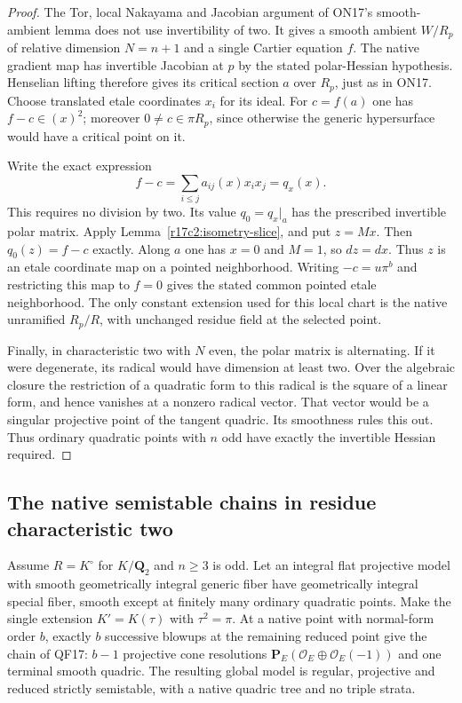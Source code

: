 \begin{proof}
The Tor, local Nakayama and Jacobian argument of ON17's
smooth-ambient lemma does not use invertibility of two.
It gives a smooth ambient $W/R_p$ of relative dimension
$N=n+1$ and a single Cartier equation $f$. The native
gradient map has invertible Jacobian at $p$ by the stated
polar-Hessian hypothesis. Henselian lifting therefore gives
its critical section $a$ over $R_p$, just as in ON17.
Choose translated etale coordinates $x_i$ for its ideal.
For $c=f(a)$ one has $f-c\in(x)^2$; moreover
$0\ne c\in\pi R_p$, since otherwise the generic
hypersurface would have a critical point on it.

Write the exact expression
\[
        f-c=\sum_{i\le j}a_{ij}(x)x_ix_j=q_x(x).
\]
This requires no division by two. Its value $q_0=q_x|_a$
has the prescribed invertible polar matrix. Apply
Lemma~\ref{r17c2:isometry-slice}, and put $z=Mx$.
Then $q_0(z)=f-c$ exactly. Along $a$ one has $x=0$
and $M=1$, so $dz=dx$. Thus $z$ is an etale coordinate
map on a pointed neighborhood. Writing $-c=u\pi^b$
and restricting this map to $f=0$ gives the stated
common pointed etale neighborhood. The only constant
extension used for this local chart is the native
unramified $R_p/R$, with unchanged residue field at
the selected point.

Finally, in characteristic two with $N$ even, the polar
matrix is alternating. If it were degenerate, its radical
would have dimension at least two. Over the algebraic
closure the restriction of a quadratic form to this
radical is the square of a linear form, and hence vanishes
at a nonzero radical vector. That vector would be a
singular projective point of the tangent quadric. Its
smoothness rules this out. Thus ordinary quadratic points
with $n$ odd have exactly the invertible Hessian required.
\end{proof}

\subsection{The native semistable chains in residue characteristic two}

\begin{proposition}
\label{r17c2:chains}
Assume $R=K^\circ$ for $K/\mathbf Q_2$ and $n\ge3$ is
odd. Let an integral flat projective model with smooth
geometrically integral generic fiber have geometrically
integral special fiber, smooth except at finitely many
ordinary quadratic points. Make the single extension
$K'=K(\tau)$ with $\tau^2=\pi$.
At a native point with normal-form order $b$, exactly
$b$ successive blowups at the remaining reduced point
give the chain of QF17: $b-1$ projective cone resolutions
$\mathbf P_E(\mathcal O_E\oplus\mathcal O_E(-1))$ and
one terminal smooth quadric. The resulting global model
is regular, projective and reduced strictly semistable,
with a native quadric tree and no triple strata.
\end{proposition}

